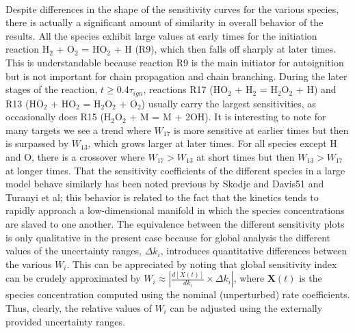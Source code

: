 \paragraph{}
Despite differences in the shape of the sensitivity curves for
the various species, there is actually a significant amount of
similarity in overall behavior of the results. All the species
exhibit large values at early times for the initiation reaction H$_2$ +
O$_2$ = HO$_2$ + H (R9), which then falls off sharply at later times.
This is understandable because reaction R9 is the main initiator
for autoignition but is not important for chain propagation and
chain branching. During the later stages of the reaction, $t \geq 0.4\tau_{ign}$, reactions R17 (HO$_2$ + H$_2$ = H$_2$O$_2$ + H) and R13 (HO$_2$
+ HO$_2$ = H$_2$O$_2$ + O$_2$) usually carry the largest sensitivities, as
occasionally does R15 (H$_2$O$_2$ + M = M + 2OH). It is
interesting to note for many targets we see a trend where $W_{17}$ is
more sensitive at earlier times but then is surpassed by $W_{13}$,
which grows larger at later times. For all species except H and
O, there is a crossover where $W_{17} > W_{13}$ at short times but then $W_{13} > W_{17}$ at longer times. That the sensitivity coefficients of
the different species in a large model behave similarly has been
noted previous by Skodje and Davis51 and Turanyi et al;\cite{ch3_52_zsely2005similarity} this
behavior is related to the fact that the kinetics tends to rapidly
approach a low-dimensional manifold in which the species
concentrations are slaved to one another. The equivalence
between the different sensitivity plots is only qualitative in the
present case because for global analysis the different values of
the uncertainty ranges, $\Delta k_i$, introduces quantitative differences
between the various $W_i$. This can be appreciated by noting that
global sensitivity index can be crudely approximated by $W_i \approx \left\vert \frac{d \left[ X(t) \right] }{dk_i} \times \Delta k_i \right\vert $, where $\mathbf{X}(t)$ is the species concentration
computed using the nominal (unperturbed) rate coefficients.
Thus, clearly, the relative values of $W_i$ can be adjusted using the
externally provided uncertainty ranges.

